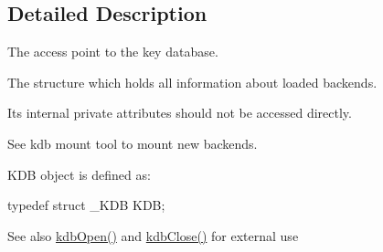 \subsection{Detailed Description}
The access point to the key database.

The structure which holds all information about loaded backends.

Its internal private attributes should not be accessed directly.

See kdb mount tool to mount new backends.

KDB object is defined as: 
\begin{DoxyCode}
typedef struct _KDB KDB;
\end{DoxyCode}


\begin{DoxySeeAlso}{See also}
\hyperlink{group__kdb_ga6808defe5870f328dd17910aacbdc6ca}{kdbOpen()} and \hyperlink{group__kdb_gadb54dc9fda17ee07deb9444df745c96f}{kdbClose()} for external use 
\end{DoxySeeAlso}


